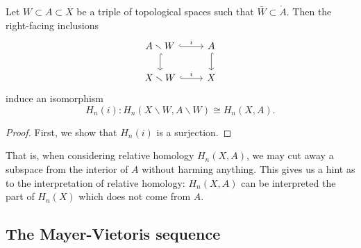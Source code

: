 \documentclass[main.tex]{subfiles}
\begin{document}
\begin{theorem}[excision]
  Let $W \subset A \subset X$ be a triple of topological spaces such that $\bar{W} \subset \mathring{A}$. Then the right-facing inclusions
  \begin{equation*}
    \begin{tikzcd}
      A \smallsetminus W
      \arrow[r, hook, "i"]
      \arrow[d, hook]
      & A
      \arrow[d, hook]
      \\
      X \smallsetminus W
      \arrow[r, hook, "i"]
      & X
    \end{tikzcd}
  \end{equation*}
  induce an isomorphism
  \begin{equation*}
    H_{n}(i)\colon H_{n}(X \smallsetminus W, A \smallsetminus W) \cong H_{n}(X, A).
  \end{equation*}
\end{theorem}
\begin{proof}
  First, we show that \(H_{n}(i)\) is a surjection.
\end{proof}

That is, when considering relative homology $H_{n}(X, A)$, we may cut away a subspace from the interior of $A$ without harming anything. This gives us a hint as to the interpretation of relative homology: $H_{n}(X, A)$ can be interpreted the part of $H_{n}(X)$ which does not come from $A$.

\subsection{The Mayer-Vietoris sequence}
\label{ssc:the_mayer_vietoris_sequence}
\end{document}
